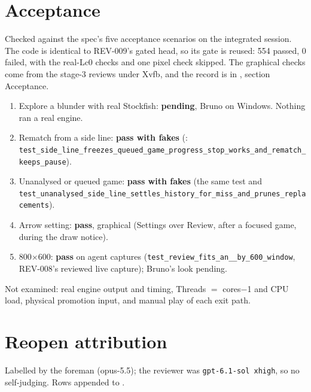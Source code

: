 \documentclass[11pt,a4paper]{article}
\begin{document}
\section*{Acceptance}

Checked against the spec's five acceptance scenarios on the integrated session. The code is
identical to REV-009's gated head, so its gate is reused: 554 passed, 0 failed, with the
real-Lc0 checks and one pixel check skipped. The graphical checks come from the stage-3 reviews
under Xvfb, and the record is in , section Acceptance.
\begin{enumerate}
  \item Explore a blunder with real Stockfish: \textbf{pending}, Bruno on Windows. Nothing ran a
        real engine.
  \item Rematch from a side line: \textbf{pass with fakes}
        (: \texttt{test\_side\_line\_\allowbreak freezes\_queued\_\allowbreak game\_progress\_\allowbreak stop\_works\_\allowbreak and\_rematch\_\allowbreak keeps\_pause}).
  \item Unanalysed or queued game: \textbf{pass with fakes} (the same test and
        \texttt{test\_unanalysed\_side\_line\_\allowbreak settles\_history\_for\_miss\_\allowbreak and\_prunes\_replacements}).
  \item Arrow setting: \textbf{pass}, graphical (Settings over Review, after a focused game, during
        the draw notice).
  \item 800$\times$600: \textbf{pass} on agent captures (\texttt{test\_review\_fits\_an\_\_by\_600\_window},
        REV-008's reviewed live capture); Bruno's look pending.
\end{enumerate}
Not examined: real engine output and timing, Threads $=$ cores$-$1 and CPU load, physical promotion
input, and manual play of each exit path.

\section*{Reopen attribution}

Labelled by the foreman (opus-5.5); the reviewer was \texttt{gpt-6.1-sol xhigh}, so no
self-judging. Rows appended to .
\end{document}
